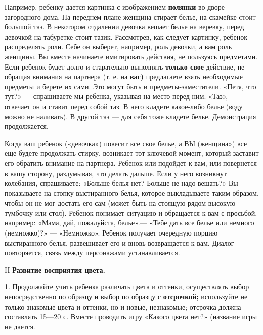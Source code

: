 \documentclass[a5paper]{book}
\begin{document}
Например, ребенку дается картинка с изображением \textbf{полянки} во
дворе загородного дома. На переднем плане женщина стирает белье, на
скамейке \textsc{стоит} большой таз. В некотором отдалении девочка
вешает белье на веревку, перед девочкой на табуретке стоит тазик.
Рассмотрев, как следует картинку, ребенок распределять роли. Себе он
выберет, например, роль девочки, а вам роль женщины. Вы вместе начинаете
имитировать действия, не пользуясь предметами. Если ребенок будет долго
и старательно выполнять \textbf{только свое} действие, не обращая
внимания на партнера (т. е. на \textbf{вас)} предлагаете взять
необходимые предметы и берете их сами. Это могут быть и
предметы-заместители. «Петя, что тут?» --- спрашиваете мы ребенка,
указывая на место перед ним. «Таз»,--- отвечает он и ставит перед собой
таз. В него кладете какое-либо белье (воду можно не наливать). В другой
таз --- для себя тоже кладете белье. Демонстрация продолжается.

Когда ваш ребенок («девочка») повесит все свое белье, а ВЫ (женщина»)
все еще будете продолжать стирку, возникает тот ключевой момент, который
заставит его обратить внимание на партнера\textbf{.} Ребенок или
подойдет к вам, или повернется в вашу сторону, раздумывая, что делать
дальше. Если у него возникнут колебания\textbf{,} спрашиваете: «Больше
белья нет? Больше не надо вешать?» Вы показываете на стопку выстиранного
белья, которое выкладываете таким образом, чтобы он не мог достать его
сам (может быть на стоящую рядом высокую тумбочку или стол). Ребенок
понимает ситуацию и обращается к вам с просьбой, например: «Мама, дай,
пожалуйста, белье».--- «Тебе дать все белье или немного (немножко)?» ---
«Немножко». Ребенок получает очередную порцию выстиранного белья,
развешивает его и вновь возвращается к вам. Диалог повторяется, связь
между персонажами устанавливается.

II \textbf{Развитие восприятия цвета.}

1. Продолжайте учить ребенка различать цвета и оттенки, осуществлять
выбор непосредственно по образцу и выбор по образцу с
\textbf{отсрочкой;} используйте не только знакомые цвета и оттенки, но и
новые, незнакомые; отсрочка должна составлять 15---20 с. Вместе
проводить игру «Какого цвета нет?» (название игры не дается.
\end{document}
